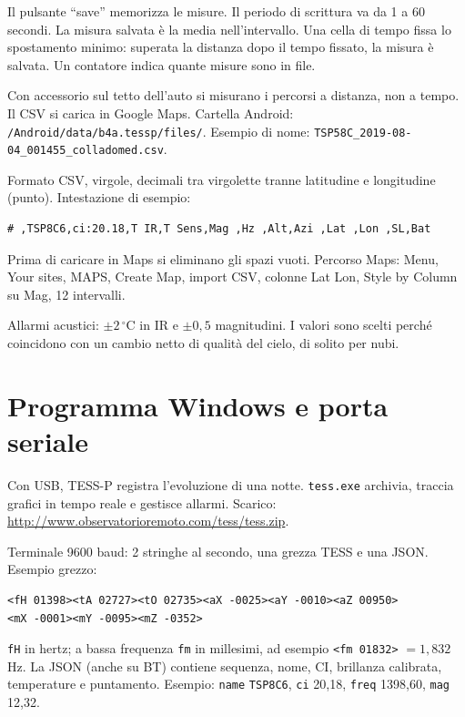 \documentclass[11pt,a4paper]{report}
\begin{document}
Il pulsante ``save'' memorizza le misure. Il periodo di scrittura va da 1 a 60 secondi. La misura salvata è la media nell'intervallo. Una cella di tempo fissa lo spostamento minimo: superata la distanza dopo il tempo fissato, la misura è salvata. Un contatore indica quante misure sono in file.

Con accessorio sul tetto dell'auto si misurano i percorsi a distanza, non a tempo. Il CSV si carica in Google Maps. Cartella Android: \texttt{/Android/data/b4a.tessp/files/}. Esempio di nome: \texttt{TSP58C\_2019-08-04\_001455\_colladomed.csv}.

Formato CSV, virgole, decimali tra virgolette tranne latitudine e longitudine (punto). Intestazione di esempio:

\begin{lstlisting}
# ,TSP8C6,ci:20.18,T IR,T Sens,Mag ,Hz ,Alt,Azi ,Lat ,Lon ,SL,Bat
\end{lstlisting}

Prima di caricare in Maps si eliminano gli spazi vuoti. Percorso Maps: Menu, Your sites, MAPS, Create Map, import CSV, colonne Lat Lon, Style by Column su Mag, 12 intervalli.

Allarmi acustici: $\pm 2\,^\circ$C in IR e $\pm 0{,}5$ magnitudini. I valori sono scelti perché coincidono con un cambio netto di qualità del cielo, di solito per nubi.

\section{Programma Windows e porta seriale}

Con USB, TESS-P registra l'evoluzione di una notte. \texttt{tess.exe} archivia, traccia grafici in tempo reale e gestisce allarmi. Scarico: \url{http://www.observatorioremoto.com/tess/tess.zip}.

Terminale 9600 baud: 2 stringhe al secondo, una grezza TESS e una JSON. Esempio grezzo:

\begin{lstlisting}
<fH 01398><tA 02727><tO 02735><aX -0025><aY -0010><aZ 00950>
<mX -0001><mY -0095><mZ -0352>
\end{lstlisting}

\texttt{fH} in hertz; a bassa frequenza \texttt{fm} in millesimi, ad esempio \texttt{<fm 01832>} $= 1{,}832$\,Hz. La JSON (anche su BT) contiene sequenza, nome, CI, brillanza calibrata, temperature e puntamento. Esempio: \texttt{name} \texttt{TSP8C6}, \texttt{ci} 20,18, \texttt{freq} 1398,60, \texttt{mag} 12,32.
\end{document}
